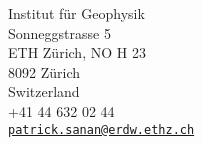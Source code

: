 {\small Institut f\"{u}r Geophysik\\ Sonneggstrasse 5\\ ETH Z\"{u}rich, NO H 23\\ 8092 Z\"{u}rich\\ Switzerland}\\
{+41 44 632 02 44} \\
\vspace{5pt}
{\tt \href{mailto:patrick.sanan@gmail.com}{patrick.sanan@erdw.ethz.ch}}\\
